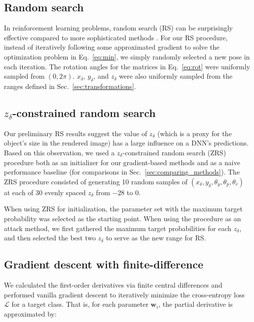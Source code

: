 \documentclass[10pt,twocolumn,letterpaper]{article}
\newcommand{\subsec}[1]{\noindent{\textbf{#1.}}}
\newcommand{\w}{\mathbf{w}}
\newcommand{\LL}{\mathcal{L}}
\begin{document}
\subsection{Random search}
\label{sec:random_search}

In reinforcement learning problems, random search (RS) can be surprisingly effective compared to more sophisticated methods \cite{such2017deep}.
For our RS procedure, instead of iteratively following some approximated gradient to solve the optimization problem in Eq.~\ref{eq:min}, we simply randomly selected a new pose in each iteration.
The rotation angles for the matrices in Eq.~\ref{eq:rot} were uniformly sampled from $(0, 2\pi)$.
$x_{\delta}$, $y_{\delta}$, and $z_{\delta}$ were also uniformly sampled from the ranges defined in Sec.~\ref{sec:transformations}.

\subsection{$z_{\delta}$-constrained random search}

Our preliminary RS results suggest the value of $z_{\delta}$ (which is a proxy for the object's size in the rendered image) has a large influence on a DNN's predictions.
Based on this observation, we used a $z_{\delta}$-constrained random search (ZRS) procedure both as an initializer for our gradient-based methods and as a naive performance baseline (for comparisons in Sec.~\ref{sec:comparing_methods}).
The ZRS procedure consisted of generating 10 random samples of $(x_{\delta}, y_{\delta}, \theta_{y}, \theta_{p}, \theta_{r})$ at each of 30 evenly spaced $z_{\delta}$ from $-28$ to $0$.

When using ZRS for initialization, the parameter set with the maximum target probability was selected as the starting point.
When using the procedure as an attack method, we first gathered the maximum target probabilities for each $z_{\delta}$, and then selected the best two $z_{\delta}$ to serve as the new range for RS.

\subsection{Gradient descent with finite-difference}
\label{sec:fd}

We calculated the first-order derivatives via finite central differences and performed vanilla gradient descent to iteratively minimize the cross-entropy loss $\LL$ for a target class.
That is, for each parameter $\w_{i}$, the partial derivative is approximated by:
\end{document}
